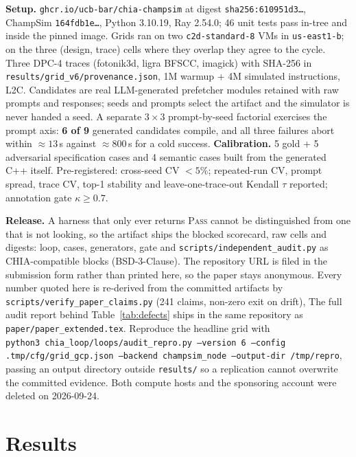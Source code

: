 \documentclass[sigconf,anonymous,nonacm]{acmart}
\begin{document}
\textbf{Setup.} \texttt{ghcr.io/ucb-bar/chia-champsim} at digest \texttt{sha256:610951d3\ldots}, ChampSim \texttt{164fdb1e\ldots}, Python 3.10.19, Ray 2.54.0; 46 unit tests pass in-tree and inside the pinned image. Grids ran on two \texttt{c2d-standard-8} VMs in \texttt{us-east1-b}; on the three (design, trace) cells where they overlap they agree to the cycle. Three DPC-4 traces (fotonik3d, ligra BFSCC, imagick) with SHA-256 in \texttt{results/grid\_v6/provenance.json}, 1M warmup + 4M simulated instructions, L2C. Candidates are real LLM-generated prefetcher modules retained with raw prompts and responses; seeds and prompts select the artifact and the simulator is never handed a seed. A separate $3{\times}3$ prompt-by-seed factorial exercises the prompt axis: \textbf{6 of 9} generated candidates compile, and all three failures abort within ${\approx}13$\,s against ${\approx}800$\,s for a cold success. \textbf{Calibration.} 5 gold + 5 adversarial specification cases and 4 semantic cases built from the generated C++ itself. Pre-registered: cross-seed CV $<5\%$; repeated-run CV, prompt spread, trace CV, top-1 stability and leave-one-trace-out Kendall $\tau$ reported; annotation gate $\kappa\geq0.7$.

\textbf{Release.} A harness that only ever returns \textsc{Pass} cannot be distinguished from one that is not looking, so the artifact ships the blocked scorecard, raw cells and digests: loop, cases, generators, gate and \texttt{scripts/independent\_audit.py} as CHIA-compatible blocks (BSD-3-Clause). The repository URL is filed in the submission form rather than printed here, so the paper stays anonymous. Every number quoted here is re-derived from the committed artifacts by \texttt{scripts/verify\_paper\_claims.py} (241 claims, non-zero exit on drift), The full audit report behind Table~\ref{tab:defects} ships in the same repository as \texttt{paper/paper\_extended.tex}. Reproduce the headline grid with\\
\texttt{python3 chia\_loop/loops/audit\_repro.py --version 6 --config .tmp/cfg/grid\_gcp.json --backend champsim\_node --output-dir /tmp/repro},
passing an output directory outside \texttt{results/} so a replication cannot overwrite the committed evidence. Both compute hosts and the sponsoring account were deleted on 2026-09-24.

\section{Results}
\label{sec:results}
\end{document}

